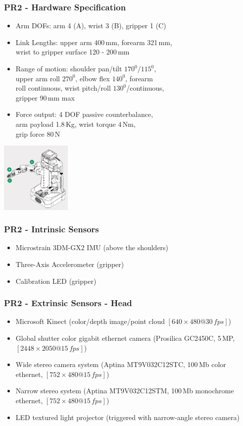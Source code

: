 \begin{frame}
  \frametitle{PR2 - Hardware Specification}
\small{
\begin{itemize}
    \item Arm DOFs: arm 4 (A), wrist 3 (B), gripper 1 (C)
    \item Link Lengths: upper arm 400\,mm, forearm 321\,mm,\\ wrist to gripper surface 120 - 200\,mm
    \item Range of motion: shoulder pan/tilt $170^0/115^0$,\\ upper arm roll $270^0$, elbow flex $140^0$, forearm \\roll continuous, wrist pitch/roll $130^0$/continuous, \\gripper 90\,mm max
    \item Force output: 4 DOF passive counterbalance, \\arm payload 1.8\,Kg, wrist torque 4\,Nm, \\grip force 80\,N
    
\end{itemize}
}
\vspace{-13ex}\hspace{47ex}\includegraphics[width=3.4cm]{img/pr2_arm.png} 
\end{frame}

\begin{frame}
  \frametitle{PR2 - Intrinsic Sensors}
\begin{itemize}
    \item Microstrain 3DM-GX2 IMU (above the shoulders)
    \item Three-Axis Accelerometer (gripper)
    \item Calibration LED (gripper) 
\end{itemize}
\end{frame}

\begin{frame}
  \frametitle{PR2 - Extrinsic Sensors - Head}
\begin{itemize}
    \item Microsoft Kinect (color/depth image/point cloud $[640\times480 @ 30\,fps]$)
    \item Global shutter color gigabit ethernet camera (Prosilica GC2450C, 5\,MP, $[2448\times2050 @ 15\,fps]$)
    \item Wide stereo camera system (Aptina MT9V032C12STC, 100\,Mb color ethernet, $[752\times480@15\,fps]$)
    \item Narrow stereo system (Aptina MT9V032C12STM, 100\,Mb monochrome ethernet, $[752\times480@15\,fps]$)    
    \item LED textured light projector (triggered with narrow-angle stereo camera)
\end{itemize}
\end{frame}

